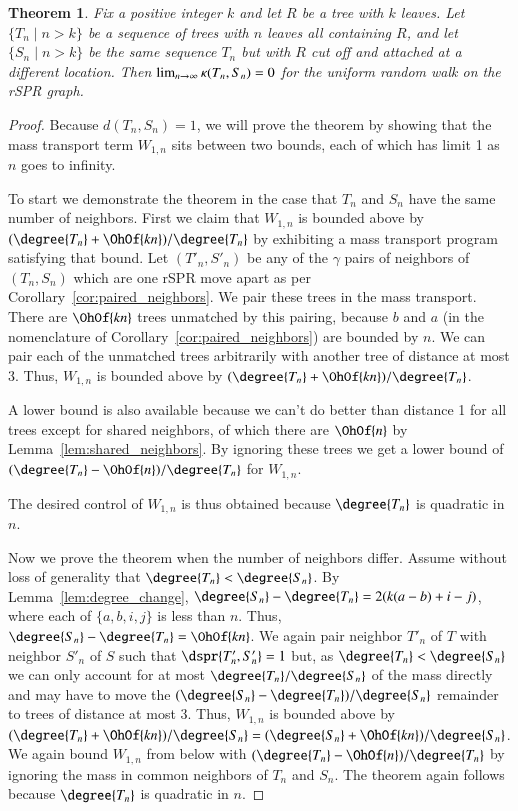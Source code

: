 \documentclass[]{elsarticle}
\newtheorem{thm}{Theorem}[section]
\newcommand{\curvature}[2][]{%
    \ifthenelse{\equal{#1}{}}%
		{\kappa(#2)}%
		{\kappa_{#1}(#2)}%
}
\newcommand{\overlap}{%
	\gamma
}
\begin{document}
\begin{thm}
\label{thm:flat_curvature}
Fix a positive integer $k$ and let $R$ be a tree with $k$ leaves.
Let $\{T_n \mid n > k\}$ be a sequence of trees with $n$ leaves all containing $R$, and let $\{S_n \mid n > k\}$ be the same sequence $T_n$ but with $R$ cut off and attached at a different location.
Then $\lim_{n \rightarrow \infty} \curvature{T_n,S_n} = 0$ for the uniform random walk on the rSPR graph.
\end{thm}
\begin{proof}
Because $d(T_n, S_n) = 1$, we will prove the theorem by showing that the mass transport term $W_{1,n}$ sits between two bounds, each of which has limit 1 as $n$ goes to infinity.

To start we demonstrate the theorem in the case that $T_n$ and $S_n$ have the same number of neighbors.
First we claim that $W_{1,n}$ is bounded above by $(\degree{T_n}+\OhOf{kn})/\degree{T_n}$ by exhibiting a mass transport program satisfying that bound.
Let $(T'_n, S'_n)$ be any of the $\overlap$ pairs of neighbors of $(T_n, S_n)$ which are one rSPR move apart as per Corollary~\ref{cor:paired_neighbors}.
We pair these trees in the mass transport.
There are $\OhOf{kn}$ trees unmatched by this pairing, because $b$ and $a$ (in the nomenclature of Corollary~\ref{cor:paired_neighbors}) are bounded by $n$.
We can pair each of the unmatched trees arbitrarily with another tree of distance at most 3.
Thus, $W_{1,n}$ is bounded above by $(\degree{T_n} + \OhOf{kn}) / \degree{T_n}$.

A lower bound is also available because we can't do better than distance 1 for all trees except for shared neighbors, of which there are $\OhOf{n}$ by Lemma~\ref{lem:shared_neighbors}.
By ignoring these trees we get a lower bound of $(\degree{T_n} - \OhOf{n})/\degree{T_n}$ for $W_{1,n}$.

The desired control of $W_{1,n}$ is thus obtained because $\degree{T_n}$ is quadratic in $n$.

Now we prove the theorem when the number of neighbors differ.
Assume without loss of generality that $\degree{T_n} < \degree{S_n}$.
By Lemma~\ref{lem:degree_change}, $\degree{S_n} - \degree{T_n} = 2(k(a-b) + i - j)$, where each of $\{a,b,i,j\}$ is less than $n$.
Thus, $\degree{S_n} - \degree{T_n} = \OhOf{kn}$.
We again pair neighbor $T'_n$ of $T$ with neighbor $S'_n$ of $S$ such that $\dspr{T'_n, S'_n}=1$ but, as $\degree{T_n} < \degree{S_n}$ we can only account for at most $\degree{T_n} / \degree{S_n}$ of the mass directly and may have to move the $(\degree{S_n} - \degree{T_n}) / \degree{S_n}$ remainder to trees of distance at most 3.
Thus, $W_{1,n}$ is bounded above by $(\degree{T_n} + \OhOf{kn}) / \degree{S_n} = (\degree{S_n} + \OhOf{kn}) / \degree{S_n}$.
We again bound $W_{1,n}$ from below with $(\degree{T_n} - \OhOf{n}) / \degree{T_n}$ by ignoring the mass in common neighbors of $T_n$ and $S_n$.
The theorem again follows because $\degree{T_n}$ is quadratic in $n$.
\end{proof}
\end{document}
